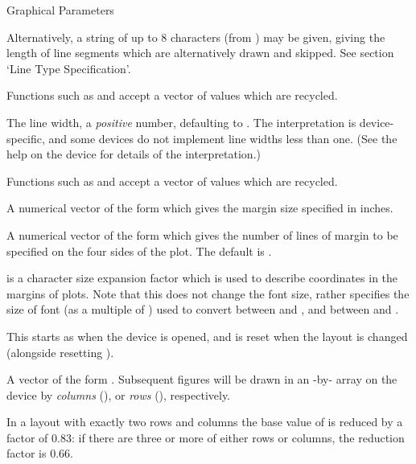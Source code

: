 \begin{Section}{Graphical Parameters}
\begin{description}
Alternatively, a string of up to 8 characters (from ) may be given, giving the length of line segments
which are alternatively drawn and skipped.  See section
`Line Type Specification'.

Functions such as  and 
accept a vector of values which are recycled.

\item[\code{lwd}] The line width, a \emph{positive} number,
defaulting to .  The interpretation is device-specific,
and some devices do not implement line widths less than one.
(See the help on the device for details of the interpretation.)

Functions such as  and 
accept a vector of values which are recycled.

\item[\code{mai}] A numerical vector of the form  which gives the margin size specified in
inches.\\{}


\item[\code{mar}] A numerical vector of the form  which gives the number of lines of margin to be
specified on the four sides of the plot.
The default is .
\item[\code{mex}] 
 is a character size expansion factor which is used to
describe coordinates in the margins of plots. Note that this does
not change the font size, rather specifies the size of font (as a
multiple of ) used to convert between  and
, and between  and .

This starts as  when the device is opened, and is reset
when the layout is changed (alongside resetting ).

\item[\code{mfcol, mfrow}] A vector of the form .
Subsequent figures will be drawn in an -by-
array on the device by \emph{columns} (), or
\emph{rows} (), respectively.

In a layout with exactly two rows and columns the base value of
 is reduced by a factor of 0.83: if there are three or
more of either rows or columns, the reduction factor is 0.66.


\end{description}
\end{Section}
